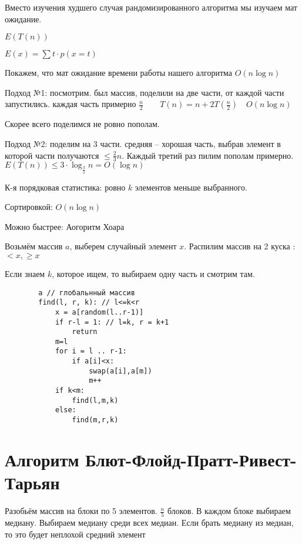 \documentclass{book}
\theoremstyle{definition}
\begin{document}
    Вместо изучения худшего случая рандомизированного алгоритма мы изучаем мат ожидание.

    $E(T(n))$

    $E(x) = \sum t\cdot p(x=t) $ 

    Покажем, что мат ожидание времени работы нашего алгоритма $O(n\log n)$

    Подход №1: посмотрим. был массив, поделили на две части, от каждой части запустились. каждая часть примерно $\frac{n}{2}\qquad T(n) = n+2T(\frac{n}{2})\quad O(n\log n)$

    Скорее всего поделимся не ровно пополам. 

    Подход №2: поделим на 3 части. средняя -- хорошая часть, выбрав элемент в которой части получаются $\leqslant \frac{2}{3}n$. Каждый третий раз пилим пополам примерно. $E(T(n)) \leqslant 3\cdot \log _{\frac{3}{2}} n = O(\log n)$


    \begin{definition}
        К-я порядковая статистика: ровно $k$ элементов меньше выбранного.
    \end{definition}

    Сортировкой: $O(n\log n)$

    Можно быстрее: Аогоритм Хоара

    Возьмём массив $a$, выберем случайный элемент $x$. Распилим массив на 2 куска : $<x, \geqslant x$

    Если знаем $k$, которое ищем, то выбираем одну часть и смотрим там.

    \begin{verbatim}
        a // глобальнный массив
        find(l, r, k): // l<=k<r
            x = a[random(l..r-1)]
            if r-l = 1: // l=k, r = k+1
                return
            m=l
            for i = l .. r-1:
                if a[i]<x:
                    swap(a[i],a[m])
                    m++
            if k<m:
                find(l,m,k)
            else:
                find(m,r,k)
    \end{verbatim}

    \section{Алгоритм Блют-Флойд-Пратт-Ривест-Тарьян}

    Разобьём массив на блоки по 5 элементов. $\frac{n}{5}$ блоков. В каждом блоке выбираем медиану. Выбираем медиану среди всех медиан. Если брать медиану из медиан, то это будет неплохой средний элемент
\end{document}
